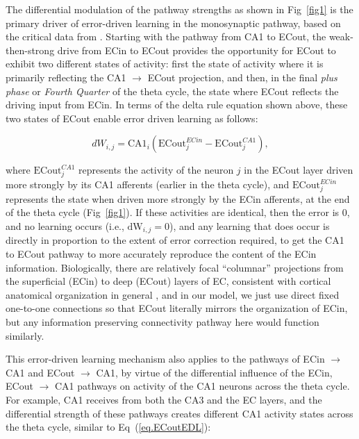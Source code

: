 \documentclass[10pt,letterpaper]{article}
\begin{document}
The differential modulation of the pathway strengths as shown in Fig~\ref{fig1} is the primary driver of error-driven learning in the monosynaptic pathway, based on the critical data from \cite{HasselmoBodelonWyble02}.  Starting with the pathway from CA1 to ECout, the weak-then-strong drive from ECin to ECout provides the opportunity for ECout to exhibit two different states of activity: first the state of activity where it is primarily reflecting the CA1 $\rightarrow$ ECout projection, and then, in the final \emph{plus phase} or \emph{Fourth Quarter} of the theta cycle, the state where ECout reflects the driving input from ECin.  In terms of the delta rule equation shown above, these two states of ECout enable error driven learning as follows:

\begin{equation}
\label{eq.ECoutEDL}
    dW_{i,j} = \mbox{CA1}_i ( \mbox{ECout}_j^{ECin} - \mbox{ECout}_j^{CA1} ) ,
\end{equation}

where $\mbox{ECout}_j^{CA1}$ represents the activity of the neuron $j$ in the ECout layer driven more strongly by its CA1 afferents (earlier in the theta cycle), and $\mbox{ECout}_j^{ECin}$ represents the state when driven more strongly by the ECin afferents, at the end of the theta cycle (Fig~\ref{fig1}).  If these activities are identical, then the error is 0, and no learning occurs (i.e., $\mbox{dW}_{i,j} = 0$), and any learning that does occur is directly in proportion to the extent of error correction required, to get the CA1 to ECout pathway to more accurately reproduce the content of the ECin information.  Biologically, there are relatively focal ``columnar'' projections from the superficial (ECin) to deep (ECout) layers of EC, consistent with cortical anatomical organization in general \cite{SurmeliMarcuMcClureEtAl15,WitterDoanJacobsenEtAl17,GerleiBrownSurmeliEtAl21}, and in our model, we just use direct fixed one-to-one connections so that ECout literally mirrors the organization of ECin, but any information preserving connectivity pathway here would function similarly.

This error-driven learning mechanism also applies to the pathways of ECin $\rightarrow$ CA1 and ECout $\rightarrow$ CA1, by virtue of the differential influence of the ECin, ECout $\rightarrow$ CA1 pathways on activity of the CA1 neurons across the theta cycle.  For example, CA1 receives from both the CA3 and the EC layers, and the differential strength of these pathways creates different CA1 activity states across the theta cycle, similar to Eq~(\ref{eq.ECoutEDL}):
\end{document}
